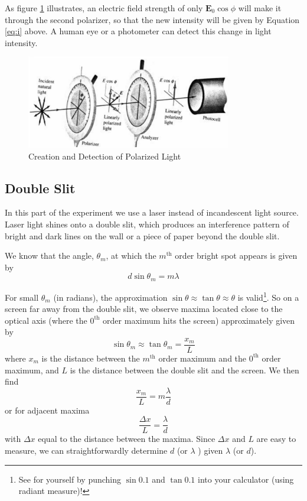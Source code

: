 As figure {\ref{fig:polarized}} illustrates, an electric field strength of only $\mathbf{E}_{0}\cos\phi$ will make it through the second polarizer, so that the new intensity will be given by Equation {\ref{eq:i}} above. A human eye or a photometer can detect this change in light intensity.
\begin{figure}[h]
\centering
\includegraphics[width=0.8\textwidth]{./Exp7/pic/image7.png}
\caption{Creation and Detection of Polarized Light}
\label{fig:polarized}
\end{figure}

\subsection{Double Slit}
In this part of the experiment we use a laser instead of incandescent light source. Laser light shines onto a double slit, which produces an interference pattern of bright and dark lines on the wall or a piece of paper beyond the double slit. \myskip

We know that the angle, $\theta_{m}$, at which the $m^{\mathrm{th}}$ order bright spot appears is given by
\begin{equation}
  d\sin\theta_{m}=m\lambda
\end{equation}

For small $\theta_{m}$ (in radians), the approximation $\sin\theta \approx \tan\theta \approx \theta$ is valid\footnote{See for yourself by punching $\sin 0.1$ and $\tan 0.1$ into your calculator (using radiant measure)!}. So on a screen far away from the double slit, we observe maxima located close to the optical axis (where the $0^{\mathrm{th}}$ order maximum hits the screen) approximately given by
\begin{equation}
\sin\theta_{m}\approx\tan\theta_{m}=\frac{x_{m}}{L}
\end{equation}
where $x_m$ is the distance between the $m^{\mathrm{th}}$ order maximum and the $0^{\mathrm{th}}$ order maximum, and $L$ is the distance between the double slit and the screen. We then find
\begin{equation}
\frac{x_{m}}{L}=m\frac{\lambda}{d}
\end{equation}
or for adjacent maxima
\begin{equation}
  \frac{\Delta x}{L}=\frac{\lambda}{d}
\end{equation}
with $\Delta x$ equal to the distance between the maxima. Since $\Delta x$ and $L$ are easy to measure, we can straightforwardly determine $d$ (or $\lambda$ ) given $\lambda$ (or $d$).

